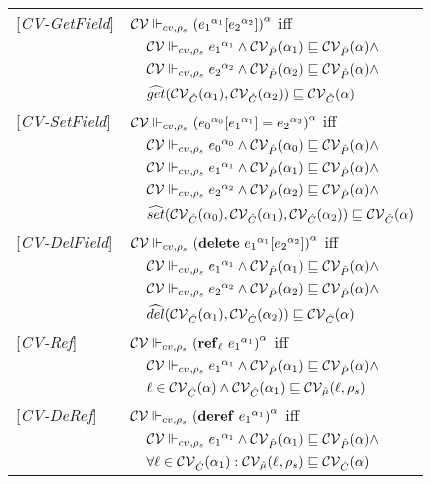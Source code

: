 \begin{table}[htb]
\begin{tabular} {l l l l}
{[\textit{CV-GetField}]}&\multicolumn{3}{l}{$\ccestl {\lookup {\lbt 1} {\lbt 2}} $ iff}\\
&&\multicolumn{2}{l}{$ \ccest {\lbt1} \wedge \Pat(\all_1) \sqsubseteq \Pat(\all) \wedge$}\\
&&\multicolumn{2}{l}{$ \ccest {\lbt 2} \wedge \Pat(\all_2) \sqsubseteq \Pat(\all) \wedge$} \\
&&\multicolumn{2}{l}{$\widehat{get} (\Cat(\all_1), \Cat(\all_2)) \sqsubseteq \Cat(\all)$} \\
{[\textit{CV-SetField}]}&\multicolumn{3}{l}{$\ccestl {\store {\lbt 0} {\lbt 1} {\lbt 2}} $ iff}\\
&&\multicolumn{2}{l}{$ \ccest {\lbt 0} \wedge \Pat(\all_0) \sqsubseteq \Pat(\all) \wedge$}\\
&&\multicolumn{2}{l}{$ \ccest {\lbt 1} \wedge \Pat(\all_1) \sqsubseteq \Pat(\all) \wedge$} \\
&&\multicolumn{2}{l}{$ \ccest {\lbt 2} \wedge \Pat(\all_2) \sqsubseteq \Pat(\all) \wedge$} \\
&&\multicolumn{2}{l}{$\widehat{set} (\Cat(\all_0), \Cat(\all_1), \Cat(\all_2)) \sqsubseteq \Cat(\all)$} \\
{[\textit{CV-DelField}]}&\multicolumn{3}{l}{$\ccestl {\delete {\lbt 1} {\lbt 2}} $ iff}\\ 
&&\multicolumn{2}{l}{$ \ccest {\lbt 1} \wedge \Pat(\all_1) \sqsubseteq \Pat(\all) \wedge$}\\
&&\multicolumn{2}{l}{$ \ccest {\lbt 2} \wedge \Pat(\all_2) \sqsubseteq \Pat(\all) \wedge$} \\
&&\multicolumn{2}{l}{$\widehat{del} (\Cat(\all_1), \Cat(\all_2)) \sqsubseteq \Cat(\all)$}\\
{[\textit{CV-Ref}]}&\multicolumn{3}{l}{$ \ccestl {\newref {\ell} {\lbt 1}} $ iff}\\
&&\multicolumn{2}{l}{$\ccest {\lbt 1} \wedge \Pat(\all_1) \sqsubseteq \Pat(\all) \wedge$}\\
&&\multicolumn{2}{l}{$\ell \in \Cat(\all) \wedge \Cat(\all_1) \sqsubseteq \muat(\ell, \rho_s) $}\\
{[\textit{CV-DeRef}]}&\multicolumn{3}{l}{$\ccestl {\deref {\lbt 1}} $ iff}\\
&&\multicolumn{2}{l}{$ \ccest {\lbt 1}\wedge \Pat(\all_1) \sqsubseteq \Pat(\all) \wedge$}\\
&&\multicolumn{2}{l}{$\forall \ell \in \Cat(\all_1) :\muat(\ell, \rho_s) \sqsubseteq \Cat(\all)$} \\

\end{tabular}
\end{table}
